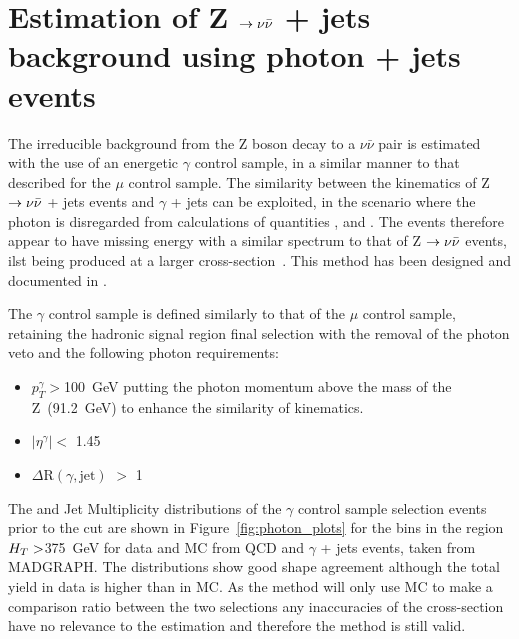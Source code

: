 
\section{Estimation of Z $\rightarrow \nu \bar{\nu}$ + jets background using photon + jets events}

The irreducible background from the Z boson decay to a $\nu \bar{\nu}$ pair is estimated with the use of an energetic $\gamma$ control sample, in a similar manner to that described for the $\mu$ control sample. The similarity between the kinematics of Z$ \rightarrow \nu \bar{\nu}$ + jets events and $\gamma$ + jets can be exploited, in the scenario where the photon is disregarded from calculations of quantities \HT, \MHT and \alt. The events therefore appear to have missing energy with a similar spectrum to that of Z $\rightarrow \nu \bar{\nu}$ events, ilst being produced at a larger cross-section~\cite{gamjetNLO}. This method has been designed and documented in \cite{SUS-10-001}.

The $\gamma$ control sample is defined similarly to that of the $\mu$ control sample, retaining the hadronic signal region final selection with the removal of the photon veto and the following photon requirements:

\begin{itemize}
\item $p^{\gamma}_{T} > $100~GeV putting the photon momentum above the mass of the Z~(91.2~GeV) to enhance the similarity of kinematics.
\item $| \eta^{\gamma}| <$ 1.45
\item $\Delta \textrm{R}(\gamma, \textrm{jet})$ $>$ 1
\end{itemize}

The \alt and Jet Multiplicity distributions of the $\gamma$ control sample selection events prior to the \alt cut are shown in Figure~\ref{fig:photon_plots} for the bins in the region $H_{T}  > $375~GeV for data and MC from QCD and $\gamma$ + jets events, taken from MADGRAPH. The distributions show good shape agreement although the total yield in data is higher than in MC. As the method will only use MC to make a comparison ratio between the two selections any inaccuracies of the cross-section have no relevance to the estimation and therefore the method is still valid.


